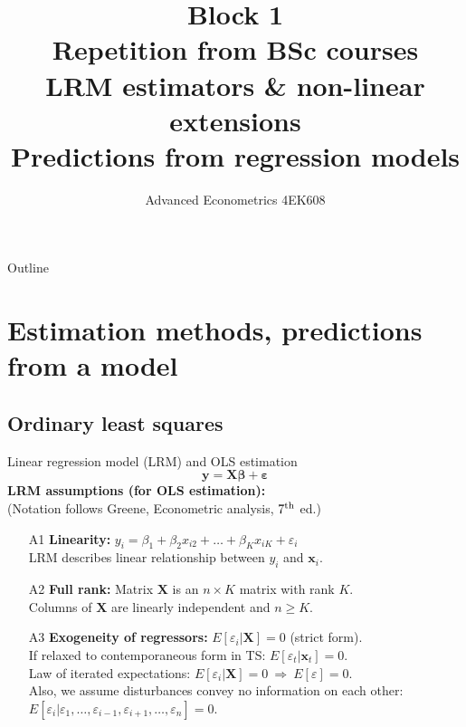 \documentclass{beamer}
\title[Block 1]{Block 1 \\  Repetition from BSc courses  \\ LRM estimators \& non-linear extensions\\ Predictions from regression models}
\author{Advanced Econometrics 4EK608}
\institute{Vysoká škola ekonomická v Praze}
\date{}
\begin{document}
 
\begin{frame}
  \titlepage
\end{frame}

\begin{frame}{Outline}
  \tableofcontents
\end{frame}

\section{Estimation methods, predictions from a model}
\subsection{Ordinary least squares}
\begin{frame}{Linear regression model (LRM) and OLS estimation}
$$
\bm{y} = \bm{X\beta} + \bm{\varepsilon}
$$
\textbf{LRM assumptions (for OLS estimation):}\\
(Notation follows Greene, Econometric analysis, $7^{\textnormal{th}}$ ed.)
\medskip
\begin{enumerate}
    \item[A1] \textbf{Linearity:} $y_i = \beta_1 + \beta_2 x_{i2} + \dots + \beta_K x_{iK} + \varepsilon_i$ \\LRM describes linear relationship between $y_i$ and $\bm{x}_i$.
    \item[A2] \textbf{Full rank:} Matrix $\bm{X}$ is an $n \! \times \! K$ matrix with rank $K$.\\ Columns of $\bm{X}$ are linearly independent and $n \geq K$.
    \item[A3] \textbf{Exogeneity of regressors:} $E[\varepsilon_i | \bm{X}]=0$ (strict form). \\If relaxed to contemporaneous form in TS: $E[\varepsilon_t | \bm{x}_t]=0$.\\Law of iterated expectations: $E[\varepsilon_i | \bm{X}]=0 ~\Rightarrow~ E[\varepsilon]=0$.\\Also, we assume disturbances convey no information on each other: $E[\varepsilon_i|\varepsilon_1,\dots,\varepsilon_{i-1},\varepsilon_{i+1},\dots,\varepsilon_n]=0$.
\end{enumerate}
\end{frame}
\end{document}
